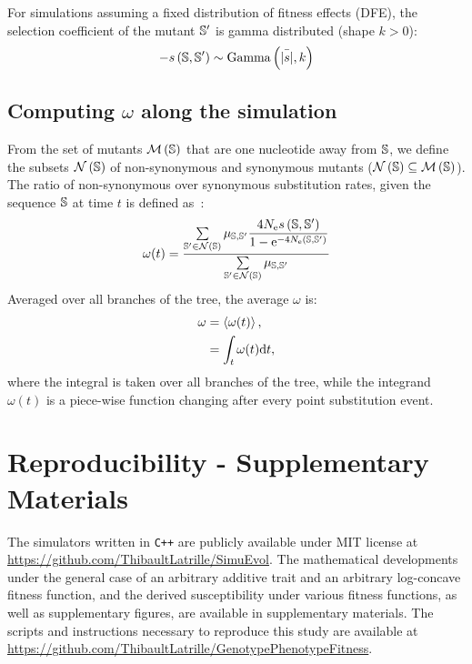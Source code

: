 \documentclass{article}
\begin{document}
For simulations assuming a fixed distribution of fitness effects ({DFE}), the selection coefficient of the mutant $\mathbb{S}'$ is gamma distributed (shape $k > 0$):
\begin{equation}
    - s \left( \mathbb{S},\mathbb{S}'\right) \sim \text{Gamma} \left( \bar{|s|}, k \right)
\end{equation}

\subsection{Computing $\omega$ along the simulation}
From the set of mutants $\mathcal{M}\left(\mathbb{S}\right)$ that are one nucleotide away from $\mathbb{S}$, we define the subsets $\mathcal{N}\left(\mathbb{S}\right)$ of {non-synonymous} and {synonymous} mutants ($\mathcal{N}\left(\mathbb{S}\right) \subseteq \mathcal{M}\left(\mathbb{S}\right)$).
The ratio of {non-synonymous} over {synonymous} {substitution} rates, given the sequence $\mathbb{S}$ at time $t$ is defined as~\citep{Spielman2015, DosReis2015, Jones2016}:
\begin{equation}
    \omega(t) = \dfrac{\sum\limits_{\mathbb{S}' \in \mathcal{N}\left(\mathbb{S}\right)} \mu_{\mathbb{S}, \mathbb{S}'} \dfrac{4 N_{\text{e}} s \left( \mathbb{S},\mathbb{S}'\right)}{{1 - \text{e}^{-4 N_{\text{e}} \left( \mathbb{S},\mathbb{S}'\right)} }}}{\sum\limits_{\mathbb{S}' \in \mathcal{N}\left(\mathbb{S}\right)} \mu_{\mathbb{S}, \mathbb{S}'}}
\end{equation}
Averaged over all branches of the tree, the average $\omega$ is:
\begin{align}
    \omega & = \left\langle \omega(t) \right\rangle, \\
    & = \int_{t} \omega (t) \mathrm{d} t,
\end{align}
where the integral is taken over all branches of the tree, while the integrand $\omega (t)$ is a piece-wise function changing after every point {substitution} event.

\section{Reproducibility - Supplementary Materials}
The simulators written in \texttt{C++} are publicly available under MIT license at \url{https://github.com/ThibaultLatrille/SimuEvol}.
The mathematical developments under the general case of an arbitrary additive trait and an arbitrary log-concave fitness function, and the derived susceptibility under various fitness functions, as well as supplementary figures, are available in supplementary materials.
The scripts and instructions necessary to reproduce this study are available at \url{https://github.com/ThibaultLatrille/GenotypePhenotypeFitness}.
\end{document}
